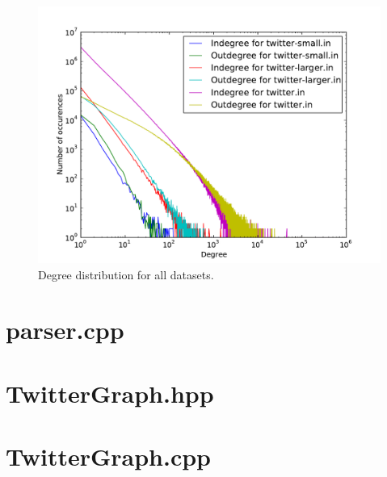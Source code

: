 \documentclass[a4paper,10pt,hidelinks]{article}
\begin{document}
\begin{figure}
	\centering
	\includegraphics[scale=0.8]{degree-distributions.pdf}
	\caption{Degree distribution for all datasets.}
\end{figure}



\pagebreak

\appendix

\section{parser.cpp}



\pagebreak

\section{TwitterGraph.hpp}



\pagebreak

\section{TwitterGraph.cpp}



\pagebreak
\end{document}
